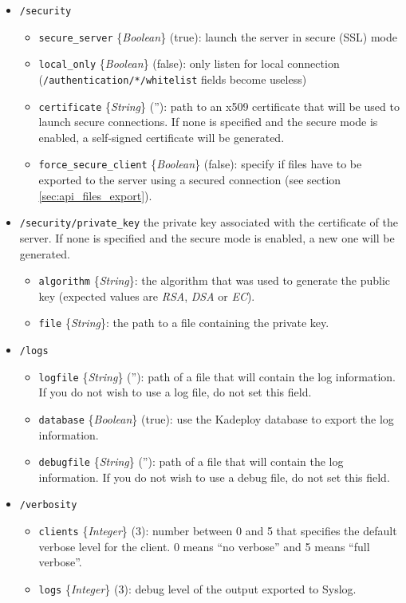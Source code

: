 \documentclass[a4wide,10pt,oneside]{book}
\newcommand{\ypath}[1]{\texttt{#1}}
\newcommand{\yfield}[2]{\texttt{#1} {\small\{{\emph{#2}}\}}:}
\newcommand{\yfieldd}[3]{\texttt{#1} {\small\{{\emph{#2}}\}} {\small(}#3{\small)}:}
\begin{document}
\begin{itemize}
  \item \ypath{/security}
  \begin{itemize}
    \item \yfieldd{secure\_server}{Boolean}{true} launch the server in secure (SSL) mode
    \item \yfieldd{local\_only}{Boolean}{false} only listen for local connection (\ypath{/authentication/*/whitelist} fields become useless)
    \item \yfieldd{certificate}{String}{''} path to an x509 certificate that will be used to launch secure connections. If none is specified and the secure mode is enabled, a self-signed certificate will be generated.
    \item \yfieldd{force\_secure\_client}{Boolean}{false} specify if files have to be exported to the server using a secured connection (see section \ref{sec:api_files_export}).
  \end{itemize}
  \item \ypath{/security/private\_key} the private key associated with the certificate of the server. If none is specified and the secure mode is enabled, a new one will be generated.
  \begin{itemize}
    \item \yfield{algorithm}{String} the algorithm that was used to generate the public key (expected values are \emph{RSA}, \emph{DSA} or \emph{EC}).
    \item \yfield{file}{String} the path to a file containing the private key.
  \end{itemize}

  \item \ypath{/logs}
  \begin{itemize}
    \item \yfieldd{logfile}{String}{''} path of a file that will contain the log information. If you do not wish to use a log file, do not set this field.
    \item \yfieldd{database}{Boolean}{true} use the Kadeploy database to export the log information.
    \item \yfieldd{debugfile}{String}{''} path of a file that will contain the log information. If you do not wish to use a debug file, do not set this field.
  \end{itemize}

  \item \ypath{/verbosity}
  \begin{itemize}
    \item \yfieldd{clients}{Integer}{3} number between 0 and 5 that specifies the default verbose level for the client. 0 means ``no verbose'' and 5 means ``full verbose''.
    \item \yfieldd{logs}{Integer}{3} debug level of the output exported to Syslog.
  \end{itemize}


\end{itemize}
\end{document}
